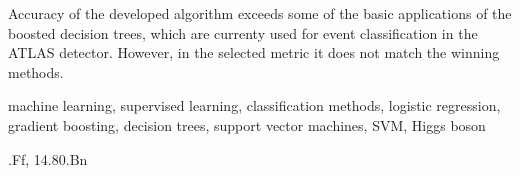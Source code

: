 Accuracy of the developed algorithm exceeds some of the basic applications of the  boosted decision trees, which are currenty used for event classification in the ATLAS detector. However, in the selected metric it does not match the winning methods.
\vspace{1.3cm}

\vspace{0.1cm}

\noindent machine learning, supervised learning, classification methods, logistic regression, gradient boosting, decision trees, support vector machines, SVM, Higgs boson
\vspace{1.3cm}

\vspace{0.1cm} 

.Ff, 14.80.Bn

\newpage

\renewcommand\thepage{} 
\tableofcontents 
\renewcommand\thepage{\arabic{page}}
\thispagestyle{empty}


\newpage

\mbox{}
\thispagestyle{empty}
\newpage

\setcounter{page}{1}


\thispagestyle{empty}
\newpage



